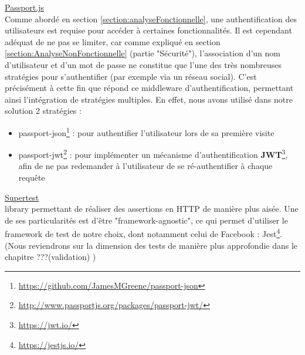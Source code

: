\noindent\underline{\href{http://www.passportjs.org/}{Passport.js}}\\

Comme abordé en section \ref{section:analyseFonctionnelle}, une authentification des utilisateurs est requise pour accéder à certaines fonctionnalités.
Il est cependant adéquat de ne pas se limiter, car comme expliqué en section \ref{section:AnalyseNonFonctionnelle} (partie "Sécurité"), l'association d'un nom d'utilisateur et d'un mot de passe ne constitue que l'une des très nombreuses stratégies pour s'authentifier (par exemple via un réseau social).
C'est précisément à cette fin que répond ce \gls{middleware} d'authentification, permettant ainsi l'intégration de stratégies multiples.
En effet, nous avons utilisé dans notre solution 2 stratégies :

\begin{itemize}
    \item passport-json\footnote{
        \url{https://github.com/JamesMGreene/passport-json}
    } : pour authentifier l'utilisateur lors de sa première visite
    \item passport-jwt\footnote{
        \url{http://www.passportjs.org/packages/passport-jwt/}
        } : pour implémenter un mécanisme d'authentification \textbf{JWT}\footnote{
            \url{https://jwt.io/}
        }, afin de ne pas redemander à l'utilisateur de se ré-authentifier à chaque requête
\end{itemize}

\noindent\underline{\href{https://github.com/visionmedia/supertest}{Supertest}}\\

\Gls{library} permettant de réaliser des assertions en HTTP de manière plus aisée.
Une de ses particularités est d'être "framework-agnostic", ce qui permet d'utiliser le framework de test de notre choix, dont notamment celui de Facebook : Jest\footnote{
    \url{https://jestjs.io/}
}. (Nous reviendrons sur la dimension des tests de manière plus approfondie dans le chapitre ???(validation) )\\

\pagebreak